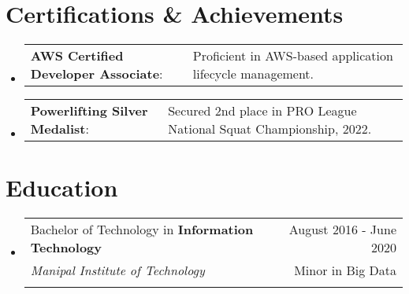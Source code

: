 \documentclass[letterpaper,11pt]{article}
\makeatletter
\newcommand{\sectionStart}{
  \begin{itemize}[label={},leftmargin=0in]
}
\newcommand{\sectionEnd}{
  \end{itemize}
}
\newcommand{\educationItem}[5]{
  \vspace{-1pt}
  \item
  \begin{tabular*}{\textwidth}{l@{\extracolsep{\fill}}r@{}}
    \footnotesize{#1 in \textbf{#2}}  & \footnotesize{#3}\\
    \footnotesize{\textit{#4}} & \footnotesize{#5}\\\vspace{-5pt}
  \end{tabular*}
  \vspace{-5pt}
}
\newcommand{\certItem}[2]{
  \vspace{-1pt}
  \item
  \begin{tabular*}{1.0\textwidth}{l@{}l@{}}
    \footnotesize{\textbf{#1}: } & \footnotesize{#2}
  \end{tabular*}\vspace{-22pt}
}
\makeatother
\begin{document}
\section{Certifications \& Achievements}
\sectionStart
    \certItem 
     {AWS Certified Developer Associate} {Proficient in AWS-based application lifecycle management.}
    \certItem 
     {Powerlifting Silver Medalist} {Secured 2nd place in PRO League National Squat Championship, 2022.}
\sectionEnd


\section{Education}
\sectionStart
  \educationItem
    {Bachelor of Technology} 
    {Information Technology} 
    {August 2016 - June 2020}
    {Manipal Institute of Technology} 
    {Minor in Big Data}
\sectionEnd
\end{document}
